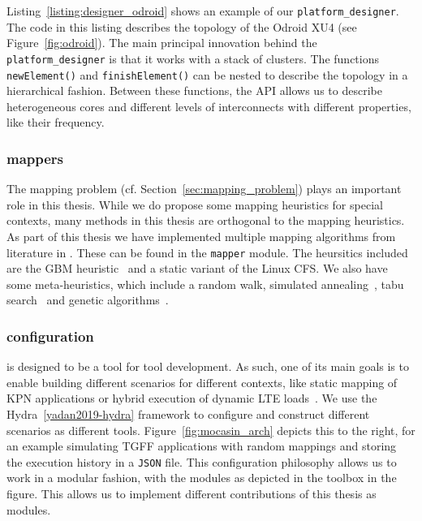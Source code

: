 Listing~\ref{listing:designer_odroid} shows an example of our \texttt{platform\_designer}.
The code in this listing describes the topology of the Odroid XU4 (see Figure~\ref{fig:odroid}). 
The main principal innovation behind the \texttt{platform\_designer} is that it works with a stack of clusters.
The functions \texttt{newElement()} and \texttt{finishElement()} can be nested to describe the topology in a hierarchical fashion.
Between these functions, the \ac{API} allows us to describe heterogeneous cores and different levels of interconnects with different properties, like their frequency.

\subsubsection{mappers}

The mapping problem (cf. Section~\ref{sec:mapping_problem}) plays an important role in this thesis.
While we do propose some mapping heuristics for special contexts, many methods in this thesis are orthogonal to the mapping heuristics.
As part of this thesis we have implemented multiple mapping algorithms from literature in \mocasin.
These can be found in the \texttt{mapper} module. 
The heursitics included are the \ac{GBM} heuristic~\cite{castrillon_dac12} and a static variant of the Linux \ac{CFS}.
We also have some meta-heuristics, which include a random walk, simulated annealing~\cite{simulated_annealing}, tabu search~\cite{tabu_search} and genetic algorithms~\cite{erbas2006multiobjective}. 

\subsubsection{configuration}

\mocasin is designed to be a tool for tool development.
As such, one of its main goals is to enable building different scenarios for different contexts, like static mapping of \ac{KPN} applications or hybrid execution of dynamic \ac{LTE} loads~\cite{menard_rapido21}.
We use the Hydra~\ref{yadan2019-hydra} framework to configure \mocasin and construct different scenarios as different tools.
Figure~\ref{fig:mocasin_arch} depicts this to the right, for an example simulating \ac{TGFF} applications with random mappings and storing the execution history in a \texttt{JSON} file.
This configuration philosophy allows us to work in a modular fashion, with the modules as depicted in the \mocasin toolbox in the figure.
This allows us to implement different contributions of this thesis as \mocasin modules.

